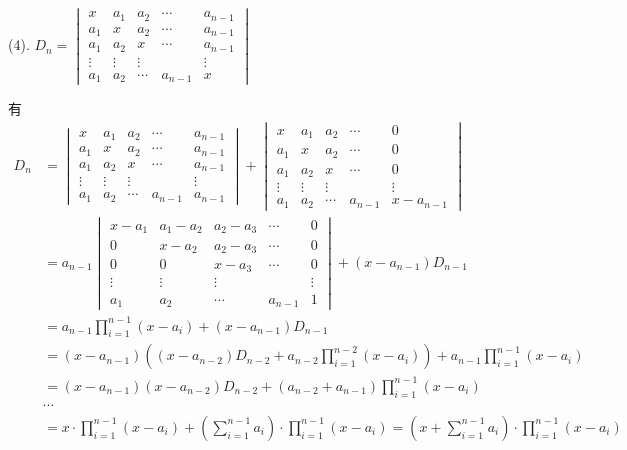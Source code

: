 (4). $D_n = \begin{vmatrix}
x & a_1 & a_2 & \cdots & a_{n-1} \\ a_1 & x & a_2 & \cdots & a_{n-1} \\ a_1 & a_2 & x & \cdots & a_{n-1} \\ \vdots & \vdots & \vdots & & \vdots \\ a_1 & a_2 & \cdots & a_{n-1} & x
\end{vmatrix}$

有
\begin{align*}
D_n & = \begin{vmatrix}
x & a_1 & a_2 & \cdots & a_{n-1} \\ a_1 & x & a_2 & \cdots & a_{n-1} \\ a_1 & a_2 & x & \cdots & a_{n-1} \\ \vdots & \vdots & \vdots & & \vdots \\ a_1 & a_2 & \cdots & a_{n-1} & a_{n-1}
\end{vmatrix} + \begin{vmatrix}
x & a_1 & a_2 & \cdots & 0 \\ a_1 & x & a_2 & \cdots & 0 \\ a_1 & a_2 & x & \cdots & 0 \\ \vdots & \vdots & \vdots & & \vdots \\ a_1 & a_2 & \cdots & a_{n-1} & x-a_{n-1} \end{vmatrix} \\
& = a_{n-1} \begin{vmatrix}
x-a_1 & a_1-a_2 & a_2-a_3 & \cdots & 0 \\ 0 & x-a_2 & a_2-a_3 & \cdots & 0 \\ 0 & 0 & x-a_3 & \cdots & 0 \\ \vdots & \vdots & \vdots & & \vdots \\ a_1 & a_2 & \cdots & a_{n-1} & 1
\end{vmatrix} + (x-a_{n-1}) D_{n-1} \\
& = a_{n-1} \prod_{i=1}^{n-1}(x-a_i) + (x-a_{n-1}) D_{n-1} \\
& = (x-a_{n-1}) \left( (x-a_{n-2})D_{n-2} + a_{n-2}\prod_{i=1}^{n-2}(x-a_i) \right) + a_{n-1} \prod_{i=1}^{n-1}(x-a_i) \\
& = (x-a_{n-1})(x-a_{n-2})D_{n-2} + (a_{n-2} + a_{n-1}) \prod_{i=1}^{n-1}(x-a_i) \\
& \cdots \\
& = x \cdot \prod_{i=1}^{n-1}(x-a_i) + \left( \sum_{i=1}^{n-1} a_i \right) \cdot \prod_{i=1}^{n-1}(x-a_i) = \left(x + \sum_{i=1}^{n-1} a_i \right) \cdot \prod_{i=1}^{n-1}(x-a_i)
\end{align*}

